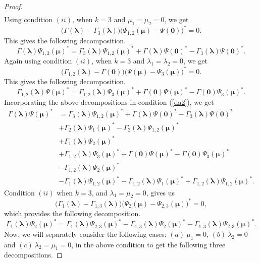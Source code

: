 \documentclass[12pt]{amsart}
\theoremstyle{definition}
\newcommand{\1}{{\mbox{\bf 1}}}
\begin{document}
\begin{proof}
\begin{equation}
\begin{split}
\end{split}
\end{equation}
Using condition $(ii)$, when $k=3$ and $\mu_1=\mu_2=0$, we get
\[
\big( \Gamma(\bm{\lambda}) - \Gamma_3(\bm{\lambda}) \big) \big( \Psi_{1,2}(\bm{\mu}) - \Psi (\bm{0}) \big)^* = 0.
\]
This gives the following decomposition.
\[
 \Gamma(\bm{\lambda})\Psi_{1,2}(\bm{\mu})^* =    \Gamma_3(\bm{\lambda}) \Psi_{1,2}(\bm{\mu})^* + \Gamma(\bm{\lambda}) \Psi(\bm{0})^* - \Gamma_3(\bm{\lambda}) \Psi(\bm{0})^*.
\]
Again using condition $(ii)$, when $k=3$ and $\lambda_1 = \lambda_2 = 0$, we get
\[
\big( \Gamma_{1,2}(\bm{\lambda}) - \Gamma (\bm{0}) \big) \big( \Psi(\bm{\mu}) - \Psi_3(\bm{\mu}) \big)^* = 0.
\]
This gives the following decomposition.
\[
\Gamma_{1,2}(\bm{\lambda}) \Psi(\bm{\mu})^* = \Gamma_{1,2}(\bm{\lambda})\Psi_{3}(\bm{\mu})^* + \Gamma(\bm{0})\Psi(\bm{\mu})^* - \Gamma(\bm{0})  \Psi_{3}(\bm{\mu})^*.
\]
Incorporating the above decompositions in condition (\ref{da2}), we get
\begin{equation}\label{da3}
\begin{split}
\Gamma(\bm{\lambda})  \Psi(\bm{\mu})^* &=  \Gamma_3(\bm{\lambda}) \Psi_{1,2}(\bm{\mu})^* + \Gamma(\bm{\lambda}) \Psi(\bm{0})^* - \Gamma_3(\bm{\lambda}) \Psi(\bm{0})^* \\
&+ \Gamma_2(\bm{\lambda}) \Psi_1(\bm{\mu})^* - \Gamma_2(\bm{\lambda}) \Psi_{1,2}(\bm{\mu})^* \\
&+ \Gamma_1(\bm{\lambda})\Psi_2(\bm{\mu})^*\\ 
&+ \Gamma_{1,2}(\bm{\lambda})\Psi_{3}(\bm{\mu})^* + \Gamma(\bm{0})\Psi(\bm{\mu})^* - \Gamma(\bm{0})  \Psi_{3}(\bm{\mu})^*\\
&- \Gamma_{1,2}(\bm{\lambda}) \Psi_{2}(\bm{\mu})^* \\
&- \Gamma_1(\bm{\lambda}) \Psi_{1,2}(\bm{\mu})^*
- \Gamma_{1,2}(\bm{\lambda})  \Psi_{1}(\bm{\mu})^* + \Gamma_{1,2}(\bm{\lambda}) \Psi_{1,2}(\bm{\mu})^*.
\end{split}
\end{equation}
Condition $(ii)$ when $k=3$, and $\lambda_1 = \mu_2 = 0$, gives us
\[
\big( \Gamma_{1}(\bm{\lambda}) - \Gamma_{1,3}(\bm{\lambda}) \big) \big( \Psi_2(\bm{\mu}) - \Psi_{2,3}(\bm{\mu}) \big)^* = 0,
\]
which provides the following decomposition.
\[
\Gamma_1(\bm{\lambda}) \Psi_{2}(\bm{\mu})^* = \Gamma_1(\bm{\lambda})  \Psi_{2,3}(\bm{\mu})^* +  \Gamma_{1,3}(\bm{\lambda}) \Psi_{2}(\bm{\mu})^* - \Gamma_{1,3}(\bm{\lambda}) \Psi_{2,3}(\bm{\mu})^*.
\]
Now, we will separately consider the following cases: $(a)~\mu_1 = 0 $, $(b)~\lambda_2 = 0$ and $(c)~\lambda_2 = \mu_1 = 0$, in the above condition to get the following three decompositions.

\end{proof}
\end{document}
